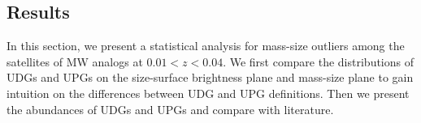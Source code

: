 \documentclass[twocolumn,astrosymb,twocolappendix]{aastex631}
\begin{document}
\begin{CJK*}{UTF8}{gbsn}


\section{Results}\label{sec:results}
In this section, we present a statistical analysis for mass-size outliers among the satellites of MW analogs at $0.01 < z < 0.04$. We first compare the distributions of UDGs and UPGs on the size-surface brightness plane and mass-size plane to gain intuition on the differences between UDG and UPG definitions. Then we present the abundances of UDGs and UPGs and compare with literature. 


\end{CJK*}
\end{document}
